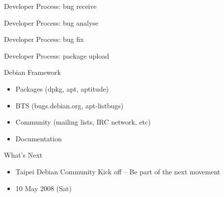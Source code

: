 \documentclass[cjk,dvipdfm,12pt]{beamer}
\begin{document}
\begin{frame}{Developer Process: bug receive}

\end{frame}

\begin{frame}{Developer Process: bug analyse}

\end{frame}


\begin{frame}{Developer Process: bug fix}

\end{frame}

\begin{frame}{Developer Process: package upload}

\end{frame}

\begin{frame}{Debian Framework}
 \begin{itemize}
  \item Packages (dpkg, apt, aptitude)
  \item BTS (bugs.debian.org, apt-listbugs)
  \item Community (mailing lists, IRC network, etc)
  \item Documentation 
 \end{itemize}
\end{frame}

\begin{frame}{What's Next}
 \begin{itemize}
  \item Taipei Debian Community Kick off 
	-- Be part of the next movement
  \item 10 May 2008 (Sat)
 \end{itemize}
\end{frame}
\end{document}
